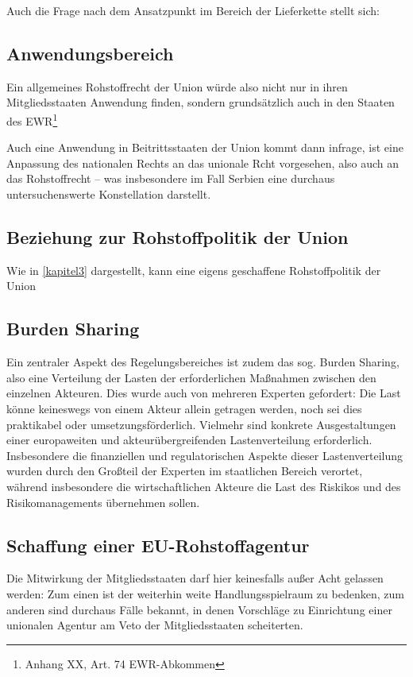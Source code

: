 \documentclass[12pt,a4paper,oneside]{book} %
\begin{document}
Auch die Frage nach dem Ansatzpunkt im Bereich der Lieferkette stellt sich:

\subsection{Anwendungsbereich}

Ein allgemeines Rohstoffrecht der Union würde also nicht nur in ihren Mitgliedsstaaten Anwendung finden, sondern grundsätzlich auch in den Staaten des EWR\footnote{Anhang XX, Art. 74 EWR-Abkommen}


Auch eine Anwendung in Beitrittsstaaten der Union kommt dann infrage, ist eine Anpassung des nationalen Rechts an das unionale Rcht vorgesehen, also auch an das Rohstoffrecht -- was insbesondere im Fall Serbien eine durchaus untersuchenswerte Konstellation darstellt.

\subsection{Beziehung zur Rohstoffpolitik der Union}
Wie in \ref{kapitel3} dargestellt, kann eine eigens geschaffene Rohstoffpolitik der Union 

\subsection{Burden Sharing}

Ein zentraler Aspekt des Regelungsbereiches ist zudem das sog. \glqq Burden Sharing\grqq, also eine Verteilung der Lasten der erforderlichen Maßnahmen zwischen den einzelnen Akteuren. Dies wurde auch von mehreren Experten gefordert: Die Last könne keineswegs von einem Akteur allein getragen werden, noch sei dies praktikabel oder umsetzungsförderlich. Vielmehr sind konkrete Ausgestaltungen einer europaweiten und akteurübergreifenden Lastenverteilung erforderlich. Insbesondere die finanziellen und regulatorischen Aspekte dieser Lastenverteilung wurden durch den Großteil der Experten im staatlichen Bereich verortet, während insbesondere die wirtschaftlichen Akteure die Last des Riskikos und des Risikomanagements übernehmen sollen.

\subsection{Schaffung einer EU-Rohstoffagentur}

Die Mitwirkung der Mitgliedsstaaten darf hier keinesfalls außer Acht gelassen werden: Zum einen ist der weiterhin weite Handlungsspielraum zu bedenken, zum anderen sind durchaus Fälle bekannt, in denen Vorschläge zu Einrichtung einer unionalen Agentur am Veto der Mitgliedsstaaten scheiterten.\autocite[im konkreten Fall ging es um die Einführung einer EU-Agentur zur Kontrolle der Umsetzung des EU-Abfallrechts]{Dauses/Ludwigs, O. Umweltpolitik Rn. 226; Europäische Kommission: Study on the feasibility of the establishment of a Waste Implementation Agency}
\end{document}
